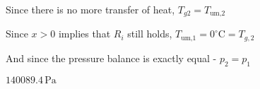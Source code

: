Since there is no more transfer of heat, \( T_{g2} = T_{\text{um,2}} \)

Since \( x > 0 \) implies that \( R_i \) still holds, \( T_{\text{um,1}} = 0^\circ \text{C} = T_{g,2} \)

And since the pressure balance is exactly equal - \( p_2 = p_1 \)

\( 140089.4 \, \text{Pa} \)